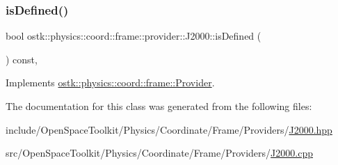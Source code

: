 \mbox{\label{classostk_1_1physics_1_1coord_1_1frame_1_1provider_1_1_j2000_ab707ff9bba9634b2ce9684ebaad342bf}} 
\subsubsection{\texorpdfstring{is\+Defined()}{isDefined()}}
{\footnotesize\ttfamily bool ostk\+::physics\+::coord\+::frame\+::provider\+::\+J2000\+::is\+Defined (\begin{DoxyParamCaption}{ }\end{DoxyParamCaption}) const\hspace{0.3cm}{\ttfamily [override]}, {\ttfamily [virtual]}}



Implements \hyperlink{classostk_1_1physics_1_1coord_1_1frame_1_1_provider_a27acab0012649796b97956fed1a91493}{ostk\+::physics\+::coord\+::frame\+::\+Provider}.



The documentation for this class was generated from the following files\+:\begin{DoxyCompactItemize}
\item 
include/\+Open\+Space\+Toolkit/\+Physics/\+Coordinate/\+Frame/\+Providers/\hyperlink{_j2000_8hpp}{J2000.\+hpp}\item 
src/\+Open\+Space\+Toolkit/\+Physics/\+Coordinate/\+Frame/\+Providers/\hyperlink{_j2000_8cpp}{J2000.\+cpp}\end{DoxyCompactItemize}
